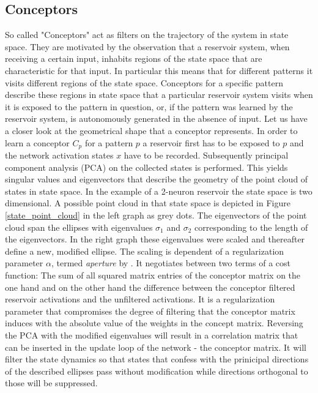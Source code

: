 \documentclass[utf8]{frontiersSCNS} %
\begin{document}
\subsection{Conceptors}
So called "Conceptors" act as filters on the trajectory of the system in state space.
They are motivated by the observation that a reservoir system, when receiving a certain input, inhabits regions of the state space that are characteristic for that input. In particular this means that for different patterns it visits different regions of the state space. Conceptors for a specific pattern describe these regions in state space that a particular reservoir system visits when it is exposed to the pattern in question, or, if the pattern was learned by the reservoir system, is autonomously generated in the absence of input. Let us have a closer look at the geometrical shape that a conceptor represents. 
In order to learn a conceptor $ C_p $ for a pattern $ p $ a reservoir first has to be exposed to $p$ and the network activation states $x$ have to be recorded. Subsequently principal component analysis (PCA) on the collected states is performed. This yields singular values and eigenvectors that describe the geometry of the point cloud of states in state space. In the example of a 2-neuron reservoir the state space is two dimensional. A possible point cloud in that state space is depicted in Figure \ref{state_point_cloud} in the left graph as grey dots. The eigenvectors of the point cloud span the ellipses with eigenvalues $ \sigma_1 $ and $ \sigma_2 $ corresponding to the length of the eigenvectors. In the right graph these eigenvalues were scaled and thereafter define a new, modified ellipse. The scaling is dependent of a regularization parameter $ \alpha  $, termed \textit{aperture} by \cite{Jaeger2014}. It negotiates between two terms of a cost function: The sum of all squared matrix entries of the conceptor matrix on the one hand and on the other hand the difference between the conceptor filtered reservoir activations and the unfiltered activations. It is a regularization parameter that compromises the degree of filtering that the conceptor matrix induces with the absolute value of the weights in the concept matrix. 
Reversing the PCA with the modified eigenvalues will result in a correlation matrix that can be inserted in the update loop of the network - the conceptor matrix. It will filter the state dynamics so that states that confess with the prinicipal directions of the described ellipses pass without modification while directions orthogonal to those will be suppressed.
\end{document}

